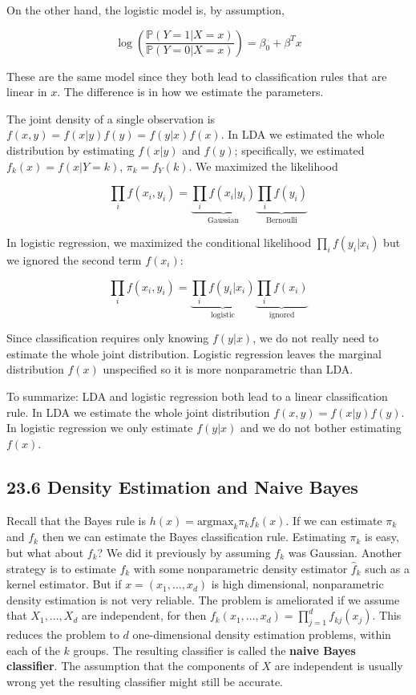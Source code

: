 On the other hand, the logistic model is, by assumption,

\[ \log \left( \frac{\mathbb{P}(Y = 1 | X = x)}{\mathbb{P}(Y = 0 | X = x)} \right) = \beta_{0} + \beta^T x \]

These are the same model since they both lead to classification rules
that are linear in \(x\). The difference is in how we estimate the
parameters.

The joint density of a single observation is
\(f(x, y) = f(x | y) f(y) = f(y | x) f(x)\). In LDA we estimated the
whole distribution by estimating \(f(x | y)\) and \(f(y)\);
specifically, we estimated \(f_{k}(x) = f(x | Y = k)\),
\(\pi_{k} = f_Y(k)\). We maximized the likelihood

\[ \prod_{i} f(x_{i}, y_{i}) = \underbrace{\prod_{i} f(x_{i} | y_{i})}_\text{Gaussian} \underbrace{ \prod_{i} f(y_{i}) }_\text{Bernoulli}\]

In logistic regression, we maximized the conditional likelihood
\(\prod_{i} f(y_{i} | x_{i})\) but we ignored the second term \(f(x_{i})\):

\[ \prod_{i} f(x_{i}, y_{i}) = \underbrace{\prod_{i} f(y_{i} | x_{i})}_\text{logistic} \underbrace{ \prod_{i} f(x_{i}) }_\text{ignored}\]

Since classification requires only knowing \(f(y | x)\), we do not really
need to estimate the whole joint distribution. Logistic regression
leaves the marginal distribution \(f(x)\) unspecified so it is more
nonparametric than LDA.

To summarize: LDA and logistic regression both lead to a linear
classification rule. In LDA we estimate the whole joint distribution
\(f(x, y) = f(x | y) f(y)\). In logistic regression we only estimate
\(f(y | x)\) and we do not bother estimating \(f(x)\).

\subsection*{23.6 Density Estimation and Naive Bayes}\label{density-estimation-and-naive-bayes}

Recall that the Bayes rule is \(h(x) = \text{argmax}_{k} \pi_{k} f_{k}(x)\).
If we can estimate \(\pi_{k}\) and \(f_{k}\) then we can estimate the Bayes
classification rule. Estimating \(\pi_{k}\) is easy, but what about
\(f_{k}\)? We did it previously by assuming \(f_{k}\) was Gaussian. Another
strategy is to estimate \(f_{k}\) with some nonparametric density
estimator \(\hat{f}_{k}\) such as a kernel estimator. But if
\(x = (x_{1}, \dots, x_d)\) is high dimensional, nonparametric density
estimation is not very reliable. The problem is ameliorated if we assume
that \(X_{1}, \dots, X_d\) are independent, for then
\(f_{k}(x_{1}, \dots, x_d) = \prod_{j=1}^{d} f_{kj}(x_{j})\). This reduces the
problem to \(d\) one-dimensional density estimation problems, within
each of the \(k\) groups. The resulting classifier is called the
\textbf{naive Bayes classifier}. The assumption that the components of
\(X\) are independent is usually wrong yet the resulting classifier
might still be accurate.

